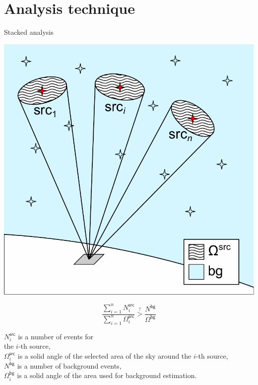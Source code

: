 \section{Analysis technique}

\begin{frame}{Stacked analysis}
\begin{minipage}[c]{0.45\textwidth}
  \includegraphics[width=1\textwidth]{pics/stacked.pdf}
\end{minipage}
\hfill
\begin{minipage}[c]{0.52\textwidth}
{
\Large
\[
\frac{\sum_{i=1}^n N_i^\mathsf{src}}{\sum_{i=1}^n \Omega_i^\mathsf{src}} \stackrel{?}{>}
\frac{N^\mathsf{bg}}{\Omega^\mathsf{bg}}
\]
}
\small

\textcolor{kit-green100}{$N_i^\mathsf{src}$} is a number of events for \\the \textcolor{kit-green100}{$i$}-th source,\\
\textcolor{kit-green100}{$\Omega_i^\mathsf{src}$} is a solid angle of the selected area of the sky around the \textcolor{kit-green100}{$i$}-th source,\\
\textcolor{kit-green100}{$N^\mathsf{bg}$} is a number of background events,\\
\textcolor{kit-green100}{$\Omega_i^\mathsf{bg}$} is a solid angle of the area used for background estimation.

\end{minipage}
\end{frame}


